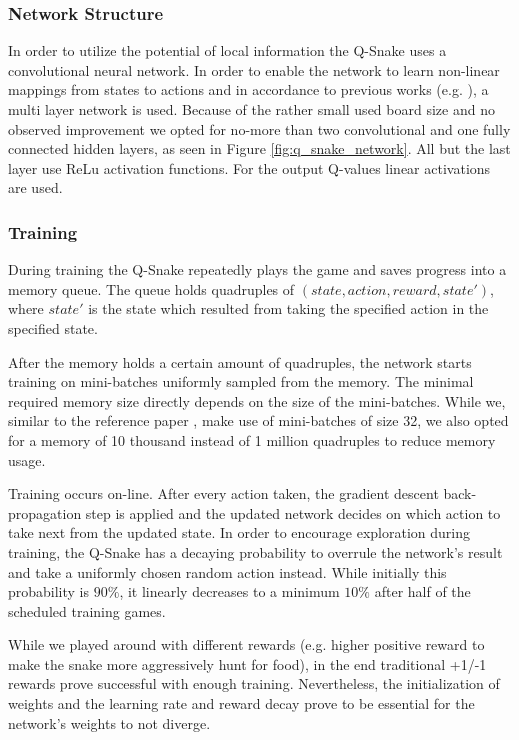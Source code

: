 \documentclass[a4paper]{article}
\begin{document}
\subsubsection{Network Structure}
In order to utilize the potential of local information the Q-Snake uses a convolutional neural network. In order to enable the network to learn non-linear mappings from states to actions and in accordance to previous works (e.g. \cite{mnih2013}), a multi layer network is used. Because of the rather small used board size and no observed improvement we opted for no-more than two convolutional and one fully connected hidden layers, as seen in Figure \ref{fig:q_snake_network}. All but the last layer use ReLu activation functions. For the output Q-values linear activations are used.

\subsubsection{Training}
During training the Q-Snake repeatedly plays the game and saves progress into a memory queue. The queue holds quadruples of $(state, action, reward, state')$, where $state'$ is the state which resulted from taking the specified action in the specified state. 

After the memory holds a certain amount of quadruples, the network starts training on mini-batches uniformly sampled from the memory. The minimal required memory size directly depends on the size of the mini-batches. While we, similar to the reference paper \cite{mnih2013}, make use of mini-batches of size 32, we also opted for a memory of 10 thousand instead of 1 million quadruples to reduce memory usage.

Training occurs on-line. After every action taken, the gradient descent back-propagation step is applied and the updated network decides on which action to take next from the updated state. In order to encourage exploration during training, the Q-Snake has a decaying probability to overrule the network's result and take a uniformly chosen random action instead. While initially this probability is $90\%$, it linearly decreases to a minimum $10\%$ after half of the scheduled training games.

While we played around with different rewards (e.g. higher positive reward to make the snake more aggressively hunt for food), in the end traditional +1/-1 rewards prove successful with enough training. Nevertheless, the initialization of weights and the learning rate and reward decay prove to be essential for the network's weights to not diverge.
\end{document}
